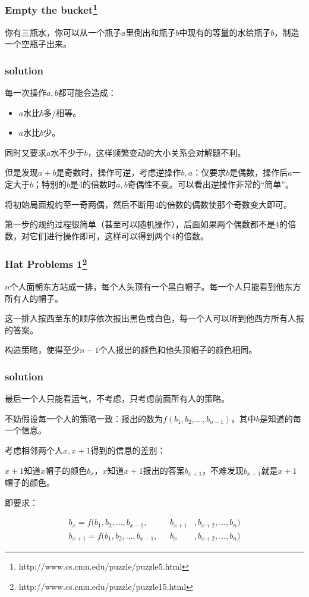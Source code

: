 \documentclass[10pt]{beamer}
\begin{document}
	\clearpage
	\begin{frame}
		\frametitle{Empty the bucket\footnote[1]{http://www.cs.cmu.edu/puzzle/puzzle5.html}}
	
		你有三瓶水，你可以从一个瓶子$a$里倒出和瓶子$b$中现有的等量的水给瓶子$b$，制造一个空瓶子出来。
	
	\end{frame}
	\clearpage
	\begin{frame}
		\frametitle{solution}
	
		每一次操作$a,b$都可能会造成：
		\begin{itemize}
			\item $a$水比$b$多/相等。
			\item $a$水比$b$少。
		\end{itemize}
		同时又要求$a$水不少于$b$，这样频繁变动的大小关系会对解题不利。

		但是发现$a+b$是奇数时，操作可逆，考虑逆操作$b,a$：仅要求$b$是偶数，操作后$a$一定大于$b$；特别的$b$是$4$的倍数时$a,b$奇偶性不变。{\color{red}可以看出逆操作非常的“简单”。}

		将初始局面规约至一奇两偶，然后不断用$4$的倍数的偶数使那个奇数变大即可。

		第一步的规约过程很简单（甚至可以随机操作），后面如果两个偶数都不是$4$的倍数，对它们进行操作即可，这样可以得到两个$4$的倍数。
	\end{frame}
	\clearpage
	\begin{frame}
		\frametitle{Hat Problems 1\footnote[1]{http://www.cs.cmu.edu/puzzle/puzzle15.html}}
	
		$n$个人面朝东方站成一排，每个人头顶有一个黑白帽子。每一个人只能看到他东方所有人的帽子。

		这一排人按西至东的顺序依次报出黑色或白色，每一个人可以听到他西方所有人报的答案。

		构造策略，使得至少$n-1$个人报出的颜色和他头顶帽子的颜色相同。
	
	\end{frame}
	\clearpage
	\begin{frame}
		\frametitle{solution}
	
		最后一个人只能看运气，不考虑，只考虑前面所有人的策略。

		不妨假设每一个人的策略一致：报出的数为$f(b_1,b_2,\dots,b_{n-1})$，其中$b$是知道的每一个信息。

		考虑相邻两个人$x,x+1$得到的信息的差别：

		$x+1$知道$x$帽子的颜色$b_x$，$x$知道$x+1$报出的答案$b_{x+1}$，不难发现$b_{x+1}$就是$x+1$帽子的颜色。

		即要求：

		$$
		\begin{aligned}
			b_x=f(b_1,b_2,\dots,b_{x-1},&~~~b_{x+1}&,b_{x+2},\dots,b_n)\\
			b_{x+1}=f(b_1,b_2,\dots,b_{x-1},&~~~b_{x}&,b_{x+2},\dots,b_n)
		\end{aligned}
		$$

	\end{frame}
	
\end{document}
